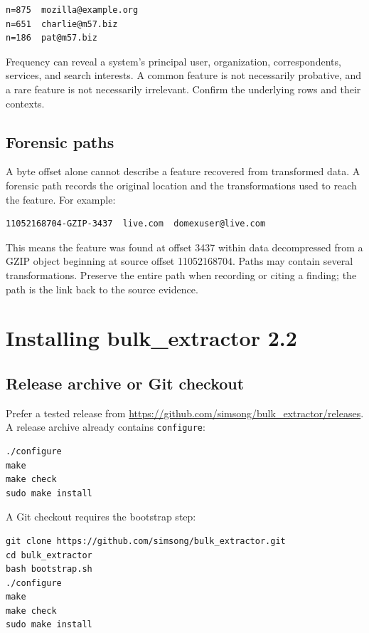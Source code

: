 \documentclass[11pt]{article}
\newcommand{\code}[1]{\texttt{#1}}
\begin{document}
\begin{Verbatim}[fontsize=\small]
n=875  mozilla@example.org
n=651  charlie@m57.biz
n=186  pat@m57.biz
\end{Verbatim}

Frequency can reveal a system's principal user, organization, correspondents,
services, and search interests. A common feature is not necessarily probative,
and a rare feature is not necessarily irrelevant. Confirm the underlying rows
and their contexts.

\subsection{Forensic paths}

A byte offset alone cannot describe a feature recovered from transformed
data. A forensic path records the original location and the transformations
used to reach the feature. For example:

\begin{Verbatim}[fontsize=\small]
11052168704-GZIP-3437  live.com  domexuser@live.com
\end{Verbatim}

This means the feature was found at offset 3437 within data decompressed from a
GZIP object beginning at source offset 11052168704. Paths may contain several
transformations. Preserve the entire path when recording or citing a finding;
the path is the link back to the source evidence.

\section{Installing bulk\_extractor 2.2}

\subsection{Release archive or Git checkout}

Prefer a tested release from
\url{https://github.com/simsong/bulk_extractor/releases}. A release archive
already contains \code{configure}:

\begin{Verbatim}
./configure
make
make check
sudo make install
\end{Verbatim}

A Git checkout requires the bootstrap step:

\begin{Verbatim}
git clone https://github.com/simsong/bulk_extractor.git
cd bulk_extractor
bash bootstrap.sh
./configure
make
make check
sudo make install
\end{Verbatim}
\end{document}
